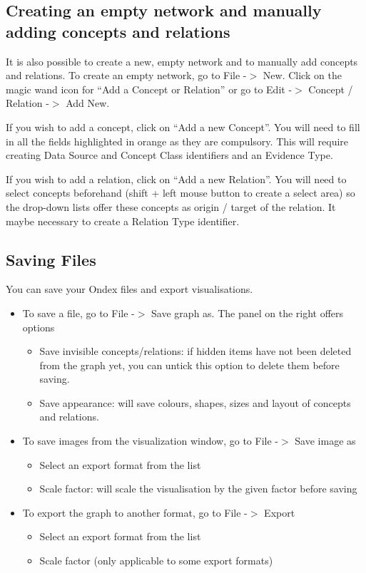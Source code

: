 \subsection{Creating an empty network and manually adding concepts and relations}
It is also possible to create a new, empty network and to manually add concepts and relations. 
To create an empty network, go to File -$>$ New. 
Click on the magic wand icon for ``Add a Concept or Relation'' or go to Edit -$>$ Concept / Relation -$>$ Add New.

If you wish to add a concept, click on ``Add a new Concept''. 
You will need to fill in all the fields highlighted in orange as they are compulsory. 
This will require creating Data Source and Concept Class identifiers and an Evidence Type.

If you wish to add a relation, click on ``Add a new Relation''. 
You will need to select concepts beforehand (shift + left mouse button to create a select area) 
so the drop-down lists offer these concepts as origin / target of the relation.
It maybe necessary to create a Relation Type identifier.

\subsection{Saving Files}
\label{sec:ref_sav}
You can save your Ondex files and export visualisations.
\begin{itemize}
\item To save a file, go to File -$>$ Save graph as. The panel on the right offers options
	\begin{itemize}
	\item Save invisible concepts/relations: if hidden items have not been deleted from the graph yet, you can untick this option to delete them before saving.
	\item Save appearance: will save colours, shapes, sizes and layout of concepts and relations.
	\end{itemize}
\item To save images from the visualization window, go to File -$>$ Save image as
	\begin{itemize}
	\item Select an export format from the list
	\item Scale factor: will scale the visualisation by the given factor before saving
	\end{itemize}
\item To export the graph to another format, go to File -$>$ Export
	\begin{itemize}
	\item Select an export format from the list
	\item Scale factor (only applicable to some export formats)
	\end{itemize}
\end{itemize}

